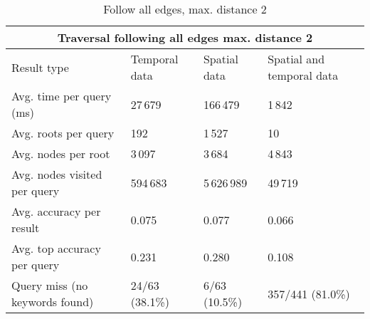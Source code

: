 \begin{table}[h]
	\caption{Follow all edges, max. distance 2}
	\label{table:followAll2}
	\begin{tabular}{ |p{3cm}||p{3cm}|p{3cm}|p{3cm}|  }
		\hline
		\multicolumn{4}{|c|}{Traversal following all edges max. distance 2}                         \\
		\hline
		Result type                    & Temporal data  & Spatial data  & Spatial and temporal data	\\
		\hline
		Avg. time per query (ms)       & 27\,679        & 166\,479      & 1\,842                    \\
		Avg. roots per query           & 192            & 1\,527        & 10                        \\
		Avg. nodes per root            & 3\,097         & 3\,684        & 4\,843                    \\
		Avg. nodes visited per query   & 594\,683       & 5\,626\,989   & 49\,719                   \\
		Avg. accuracy per result       & 0.075          & 0.077         & 0.066                     \\
		Avg. top accuracy per query    & 0.231          & 0.280         & 0.108                     \\
		Query miss (no keywords found) & 24/63 (38.1\%) & 6/63 (10.5\%) & 357/441 (81.0\%)          \\
		\hline
	\end{tabular}
\end{table}